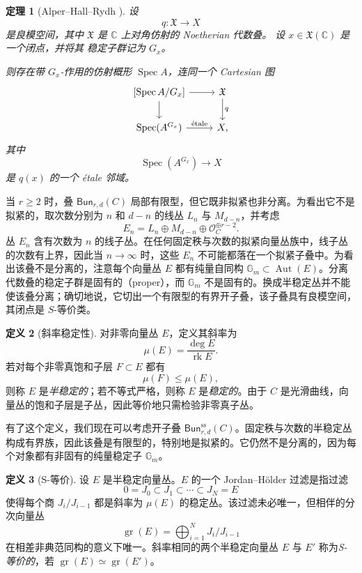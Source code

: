 \documentclass{amsart}
\newtheorem{thm}{定理}[section]
\theoremstyle{definition}
\newtheorem{defn}[thm]{定义}
\theoremstyle{remark}
\theoremstyle{plain}
\theoremstyle{definition}
\theoremstyle{remark}
\newcommand{\G}{\mathbb{G}}
\newcommand{\C}{\mathbb{C}}
\newcommand{\mc}[1]{\mathcal{#1}}
\newcommand{\mf}[1]{\mathfrak{#1}}
\newcommand{\mr}[1]{\mathrm{#1}}
\newcommand{\on}[1]{\operatorname{#1}}
\newcommand{\ms}[1]{\mathsf{#1}}
\newcommand{\1}{\mathbf{1}}
\newcommand{\2}{\mathbf{2}}
\newcommand{\3}{\mathbf{3}}
\begin{document}
\begin{thm}[Alper--Hall--Rydh {\cite{AHR2020}}]
    设
    \[
        q\colon \mf{X}\longrightarrow X
    \]
    是良模空间，其中 \(\mf{X}\) 是 \(\C\) 上对角仿射的 Noetherian
    代数叠。
    设 \(x\in\mf{X}(\C)\) 是一个闭点，并将其
    稳定子群记为 \(G_x\)。

    则存在带 \(G_x\)-作用的仿射概形 \(\on{Spec}A\)，连同一个 Cartesian 图
    \[
        \begin{tikzcd}
            {[\on{Spec}A/G_x]}
                \arrow[r]
                \arrow[d]
            & \mf{X}
                \arrow[d, "q"]
            \\
            \on{Spec}(A^{G_x})
                \arrow[r, "\mathrm{\acute{e}tale}"]
            & X,
        \end{tikzcd}
    \]
    其中
    \[
        \on{Spec}(A^{G_x})\longrightarrow X
    \]
    是 \(q(x)\) 的一个 \'etale 邻域。
\end{thm}

当 \(r\geq 2\) 时，叠 \(\ms{Bun}_{r,d}(C)\) 局部有限型，但它既非拟紧也非分离。为看出它不是拟紧的，取次数分别为 \(n\) 和 \(d-n\) 的线丛 \(L_n\) 与 \(M_{d-n}\)，并考虑
\[
    E_n=L_n\oplus M_{d-n}\oplus\mc{O}_C^{\oplus r-2}.
\]
丛 \(E_n\) 含有次数为 \(n\) 的线子丛。在任何固定秩与次数的拟紧向量丛族中，线子丛的次数有上界，因此当 \(n\to\infty\) 时，这些 \(E_n\) 不可能都落在一个拟紧子叠中。为看出该叠不是分离的，注意每个向量丛 \(E\) 都有纯量自同构 \(\G_m\subset\on{Aut}(E)\)。分离代数叠的稳定子群是固有的（proper），而 \(\G_m\) 不是固有的。换成半稳定丛并不能使该叠分离；确切地说，它切出一个有限型的有界开子叠，该子叠具有良模空间，其闭点是 \(S\)-等价类。

\begin{defn}[斜率稳定性]
    对非零向量丛 \(E\)，定义其斜率为
    \[ \mu(E)=\frac{\deg E}{\on{rk}E}. \]
    若对每个非零真饱和子层 \(F\subset E\) 都有
    \[ \mu(F)\leq\mu(E), \]
    则称 \(E\) 是\textit{半稳定的}；若不等式严格，则称 \(E\) 是\textit{稳定的}。由于 \(C\) 是光滑曲线，向量丛的饱和子层是子丛，因此等价地只需检验非零真子丛。
\end{defn}

有了这个定义，我们现在可以考虑开子叠 \(\ms{Bun}_{r,d}^{\mr{ss}}(C)\)。固定秩与次数的半稳定丛构成有界族，因此该叠是有限型的，特别地是拟紧的。它仍然不是分离的，因为每个对象都有非固有的纯量稳定子 \(\G_m\)。

\begin{defn}[S-等价]
    设 \(E\) 是半稳定向量丛。\(E\) 的一个 Jordan--H\"older 过滤是指过滤
    \[ 0=J_0\subset J_1\subset\cdots\subset J_N=E \]
    使得每个商 \(J_i/J_{i-1}\) 都是斜率为 \(\mu(E)\) 的稳定丛。该过滤未必唯一，但相伴的分次向量丛
    \[
        \on{gr}(E)=\bigoplus_{i=1}^N J_i/J_{i-1}
    \]
    在相差非典范同构的意义下唯一。斜率相同的两个半稳定向量丛 \(E\) 与 \(E'\) 称为\textit{S-等价的}，若 \(\on{gr}(E)\simeq\on{gr}(E')\)。
\end{defn}
\end{document}
